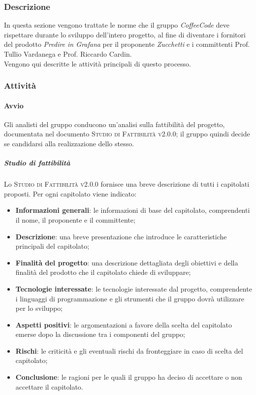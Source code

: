 \documentclass[../norme-di-progetto.tex]{subfiles}
\begin{document}
\subsubsection{Descrizione}
In questa sezione vengono trattate le norme che il gruppo \emph{CoffeeCode} deve rispettare durante lo sviluppo dell'intero progetto, al fine di diventare i fornitori del prodotto \emph{Predire in Grafana} per il proponente \emph{Zucchetti} e i committenti Prof. Tullio Vardanega e Prof. Riccardo Cardin. \\
Vengono qui descritte le attività principali di questo processo.

\subsubsection{Attività}

\paragraph{Avvio}
Gli analisti del gruppo conducono un'analisi sulla fattibilità del progetto, documentata nel documento \textsc{Studio di Fattibilità v2.0.0}; il gruppo quindi decide se candidarsi alla realizzazione dello stesso.
\subparagraph*{Studio di fattibilità}
Lo \textsc{Studio di Fattibilità v2.0.0} fornisce una breve descrizione di tutti i capitolati proposti. Per ogni capitolato viene indicato:
\begin{itemize}
  \item \textbf{Informazioni generali}: le informazioni di base del capitolato, comprendenti il nome, il proponente e il committente;
  \item \textbf{Descrizione}: una breve presentazione che introduce le caratteristiche principali del capitolato;
  \item \textbf{Finalità del progetto}: una descrizione dettagliata degli obiettivi e della finalità del prodotto che il capitolato chiede di sviluppare;
  \item \textbf{Tecnologie interessate}: le tecnologie interessate dal progetto, comprendente i linguaggi di programmazione e gli strumenti che il gruppo dovrà utilizzare per lo sviluppo;
  \item \textbf{Aspetti positivi}: le argomentazioni a favore della scelta del capitolato emerse dopo la discussione tra i componenti del gruppo;
  \item \textbf{Rischi}: le criticità e gli eventuali rischi da fronteggiare in caso di scelta del capitolato;
  \item \textbf{Conclusione}: le ragioni per le quali il gruppo ha deciso di accettare o non accettare il capitolato.
\end{itemize}
\end{document}
